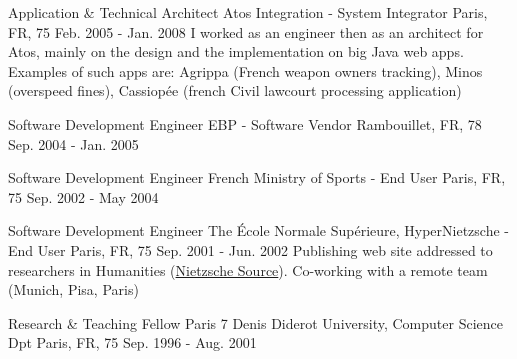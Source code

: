 \begin{cventries}
  \cventry
    {Application \& Technical Architect} %
    {Atos Integration - System Integrator} %
    {Paris, FR, 75} %
    {Feb. 2005 - Jan. 2008} %
    {I worked as an engineer then as an architect for Atos, mainly on the design and the implementation on big Java web apps. Examples of such apps are: Agrippa (French weapon owners tracking), Minos (overspeed fines), Cassiopée (french Civil lawcourt processing application)}
    {
      \begin{cvitems} %
        \item {}
      \end{cvitems}
    }

  \cventry
    {Software Development Engineer} %
    {EBP - Software Vendor} %
    {Rambouillet, FR, 78} %
    {Sep. 2004 - Jan. 2005} %
    {}
    {
      \begin{cvitems} %
        \item {}
      \end{cvitems}
    }

  \cventry
    {Software Development Engineer} %
    {French Ministry of Sports - End User} %
    {Paris, FR, 75} %
    {Sep. 2002 - May 2004} %
    {}
    {
      \begin{cvitems} %
        \item {}
      \end{cvitems}
    }

  \cventry
    {Software Development Engineer} %
    {The \'Ecole Normale Supérieure, HyperNietzsche - End User} %
    {Paris, FR, 75} %
    {Sep. 2001 - Jun. 2002} %
    {Publishing web site addressed to researchers in Humanities (\href{http://www.nietzschesource.org}{Nietzsche Source}). 
Co-working with a remote team (Munich, Pisa, Paris)}
    {
      \begin{cvitems} %
        \item {}
      \end{cvitems}
    }

  \cventry
    {Research \& Teaching Fellow} %
    {Paris 7 Denis Diderot University, Computer Science Dpt} %
    {Paris, FR, 75} %
    {Sep. 1996 - Aug. 2001} %
    {}
    {
      \begin{cvitems} %
        \item {}
      \end{cvitems}
    }


\end{cventries}
